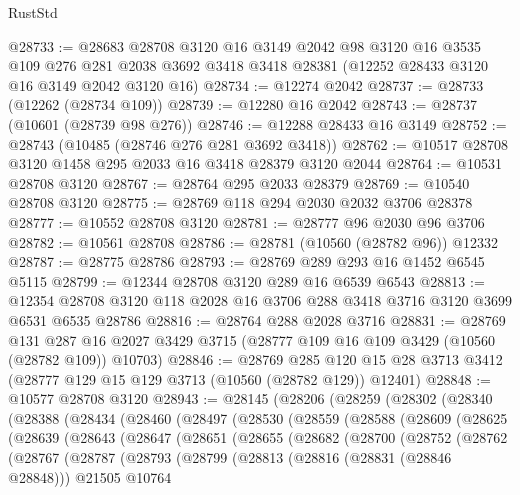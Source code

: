 \begin{lexlean}{RustStd}
\begin{coremodule}
@28733 := @28683
    @28708
    @3120
    @16
    @3149
    @2042
    @98
    @3120
    @16
    @3535
    @109
    @276
    @281
    @2038
    @3692
    @3418
    @3418
    @28381
    (@12252 @28433 @3120 @16 @3149 @2042 @3120 @16)
@28734 := @12274 @2042
@28737 := @28733 (@12262 (@28734 @109))
@28739 := @12280 @16 @2042
@28743 := @28737 (@10601 (@28739 @98 @276))
@28746 := @12288 @28433 @16 @3149
@28752 := @28743 (@10485 (@28746 @276 @281 @3692 @3418))
@28762 := @10517 @28708 @3120 @1458 @295 @2033 @16 @3418 @28379 @3120 @2044
@28764 := @10531 @28708 @3120
@28767 := @28764 @295 @2033 @28379
@28769 := @10540 @28708 @3120
@28775 := @28769 @118 @294 @2030 @2032 @3706 @28378
@28777 := @10552 @28708 @3120
@28781 := @28777 @96 @2030 @96 @3706
@28782 := @10561 @28708
@28786 := @28781 (@10560 (@28782 @96)) @12332
@28787 := @28775 @28786
@28793 := @28769 @289 @293 @16 @1452 @6545 @5115
@28799 := @12344 @28708 @3120 @289 @16 @6539 @6543
@28813 := @12354 @28708 @3120 @118 @2028 @16 @3706 @288 @3418 @3716 @3120 @3699 @6531 @6535 @28786
@28816 := @28764 @288 @2028 @3716
@28831 := @28769
    @131
    @287
    @16
    @2027
    @3429
    @3715
    (@28777 @109 @16 @109 @3429 (@10560 (@28782 @109)) @10703)
@28846 := @28769
    @285
    @120
    @15
    @28
    @3713
    @3412
    (@28777 @129 @15 @129 @3713 (@10560 (@28782 @129)) @12401)
@28848 := @10577 @28708 @3120
@28943 := @28145
    (@28206
      (@28259
        (@28302
          (@28340
            (@28388
              (@28434
                (@28460
                  (@28497
                    (@28530
                      (@28559
                        (@28588
                          (@28609
                            (@28625
                              (@28639
                                (@28643
                                  (@28647
                                    (@28651
                                      (@28655
                                        (@28682
                                          (@28700
                                            (@28752
                                              (@28762
                                                (@28767
                                                  (@28787
                                                    (@28793
                                                      (@28799
                                                        (@28813
                                                          (@28816 (@28831 (@28846 @28848)))
                                                          @21505
                                                          @10764

\end{coremodule}
\end{lexlean}
